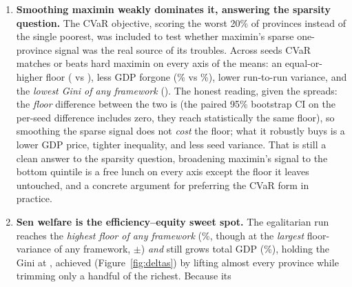 \documentclass[11pt,a4paper]{article}
\begin{document}
\begin{enumerate}
    \emph{single}-seed version of this same experiment had shown maximin's
    floor landing fractionally \emph{below} the utilitarian one, which invited
    a tidy ``maximin under-optimizes its own objective'' story; replication
    dissolves that story as seed luck (the utilitarian floor's huge variance is
    what produced the crossing). It is a small but clean demonstration of why
    the multi-seed protocol of Section~\ref{sec:threats} matters: the headline
    of a gradient-free comparison can invert between seeds. What \emph{is}
    robust across seeds is the leveling-down \emph{shape}: maximin still cuts
    the richest tail hard (down roughly 35--45\% in Figure~\ref{fig:deltas})
    because everything above the minimum is worth nothing to it, and the GDP
    it concedes for the higher floor is a real \cmpRawlsGdpDelta\%.
    \item \textbf{Smoothing maximin weakly dominates it, answering the
    sparsity question.} The CVaR objective, scoring the worst 20\% of provinces
    instead of the single poorest, was included to test whether maximin's sparse
    one-province signal was the real source of its troubles. Across \cmpSeeds{}
    seeds CVaR matches or beats hard maximin on every axis of the means: an
    equal-or-higher floor (\cmpCvarWorst{} vs \cmpRawlsWorst), less GDP forgone
    (\cmpCvarGdpDelta\% vs \cmpRawlsGdpDelta\%), lower run-to-run variance, and
    the \emph{lowest Gini of any framework} (\cmpCvarGini). The honest reading,
    given the spreads: the \emph{floor} difference between the two is
    \sigCvarRawlsFloor{} (the paired 95\% bootstrap CI on the per-seed difference
    includes zero, they reach statistically the same floor), so smoothing the
    sparse signal does
    not \emph{cost} the floor; what it robustly buys is a lower GDP price, tighter
    inequality, and less seed variance. That is still a clean answer to the
    sparsity question, broadening maximin's signal to the bottom quintile is a
    free lunch on every axis except the floor it leaves untouched, and a
    concrete argument for preferring the CVaR form in practice.
    \item \textbf{Sen welfare is the efficiency--equity sweet spot.} The
    egalitarian run reaches the \emph{highest floor of any framework}
    (\cmpEgalWorstDelta\%, though at the \emph{largest} floor-variance of any
    framework, $\pm$\cmpEgalWorstStd)
    \emph{and} still grows total GDP (\cmpEgalGdpDelta\%), holding the Gini at
    \cmpEgalGini{}, achieved (Figure~\ref{fig:deltas}) by lifting almost
    every province while trimming only a handful of the richest. Because its

\end{enumerate}
\end{document}
